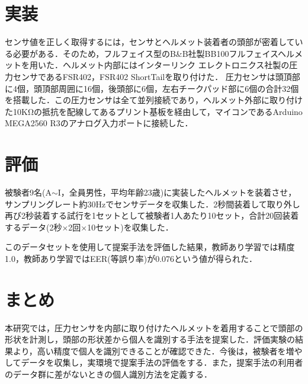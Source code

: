 \documentclass[Japanese,noauthor]{dicomopapers}
\begin{document}
\section{実装}
センサ値を正しく取得するには，センサとヘルメット装着者の頭部が密着している必要がある．そのため，フルフェイス型のB\&B社製BB100フルフェイスヘルメットを用いた．ヘルメット内部にはインターリンク エレクトロニクス社製の圧力センサであるFSR402，FSR402 ShortTailを取り付けた．%
圧力センサは頭頂部に4個，頭頂部周囲に16個，後頭部に6個，左右チークパッド部に6個の合計32個を搭載した．この圧力センサは全て並列接続であり，ヘルメット外部に取り付けた10KΩの抵抗を配線してあるプリント基板を経由して，マイコンであるArduino MEGA2560 R3のアナログ入力ポートに接続した．


\section{評価}
被験者9名(A$\sim$I，全員男性，平均年齢23歳)に実装したヘルメットを装着させ，サンプリングレート約30Hzでセンサデータを収集した．2秒間装着して取り外し再び2秒装着する試行を1セットとして被験者1人あたり10セット，合計20回装着するデータ(2秒$\times$2回$\times$10セット)を収集した．\par
このデータセットを使用して提案手法を評価した結果，教師あり学習では精度1.0，教師あり学習ではEER(等誤り率)が0.076という値が得られた．

\section{まとめ}
本研究では，圧力センサを内部に取り付けたヘルメットを着用することで頭部の形状を計測し，頭部の形状差から個人を識別する手法を提案した．評価実験の結果より，高い精度で個人を識別できることが確認できた．今後は，被験者を増やしてデータを収集し，実環境で提案手法の評価をする．また，提案手法の利用者のデータ群に差がないときの個人識別方法を定義する．




\end{document}
